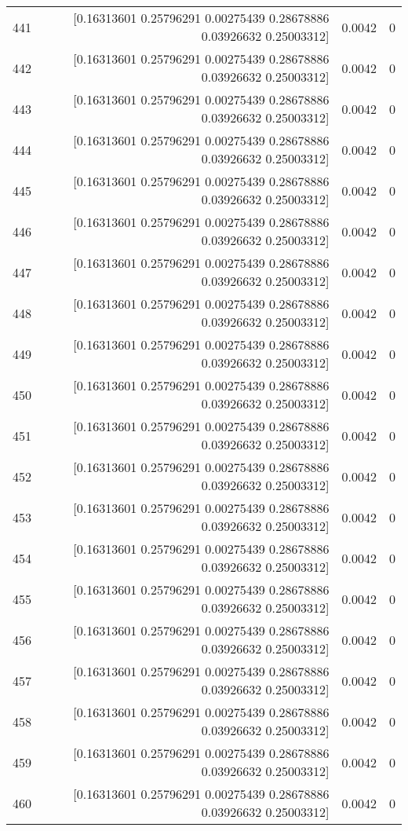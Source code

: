 \begin{longtable}{lrrr}
441 & [0.16313601 0.25796291 0.00275439 0.28678886 0.03926632 0.25003312] & 0.0042 & 0 \\
442 & [0.16313601 0.25796291 0.00275439 0.28678886 0.03926632 0.25003312] & 0.0042 & 0 \\
443 & [0.16313601 0.25796291 0.00275439 0.28678886 0.03926632 0.25003312] & 0.0042 & 0 \\
444 & [0.16313601 0.25796291 0.00275439 0.28678886 0.03926632 0.25003312] & 0.0042 & 0 \\
445 & [0.16313601 0.25796291 0.00275439 0.28678886 0.03926632 0.25003312] & 0.0042 & 0 \\
446 & [0.16313601 0.25796291 0.00275439 0.28678886 0.03926632 0.25003312] & 0.0042 & 0 \\
447 & [0.16313601 0.25796291 0.00275439 0.28678886 0.03926632 0.25003312] & 0.0042 & 0 \\
448 & [0.16313601 0.25796291 0.00275439 0.28678886 0.03926632 0.25003312] & 0.0042 & 0 \\
449 & [0.16313601 0.25796291 0.00275439 0.28678886 0.03926632 0.25003312] & 0.0042 & 0 \\
450 & [0.16313601 0.25796291 0.00275439 0.28678886 0.03926632 0.25003312] & 0.0042 & 0 \\
451 & [0.16313601 0.25796291 0.00275439 0.28678886 0.03926632 0.25003312] & 0.0042 & 0 \\
452 & [0.16313601 0.25796291 0.00275439 0.28678886 0.03926632 0.25003312] & 0.0042 & 0 \\
453 & [0.16313601 0.25796291 0.00275439 0.28678886 0.03926632 0.25003312] & 0.0042 & 0 \\
454 & [0.16313601 0.25796291 0.00275439 0.28678886 0.03926632 0.25003312] & 0.0042 & 0 \\
455 & [0.16313601 0.25796291 0.00275439 0.28678886 0.03926632 0.25003312] & 0.0042 & 0 \\
456 & [0.16313601 0.25796291 0.00275439 0.28678886 0.03926632 0.25003312] & 0.0042 & 0 \\
457 & [0.16313601 0.25796291 0.00275439 0.28678886 0.03926632 0.25003312] & 0.0042 & 0 \\
458 & [0.16313601 0.25796291 0.00275439 0.28678886 0.03926632 0.25003312] & 0.0042 & 0 \\
459 & [0.16313601 0.25796291 0.00275439 0.28678886 0.03926632 0.25003312] & 0.0042 & 0 \\
460 & [0.16313601 0.25796291 0.00275439 0.28678886 0.03926632 0.25003312] & 0.0042 & 0 \\

\end{longtable}
